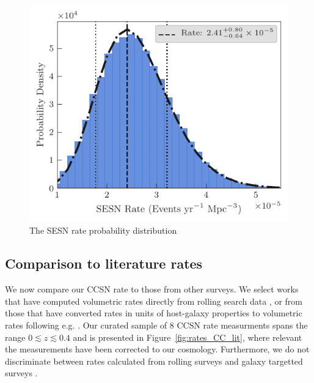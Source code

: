 \documentclass[a4paper,fleqn,usenatbib]{mnras}
\begin{document}
\begin{figure}
	\includegraphics[width=\linewidth]{./SESN_Rate.pdf}
    \caption{The SESN rate probability distribution}
    \label{fig:SESNrateProbDist}
\end{figure}

\subsection{Comparison to literature rates}

We now compare our CCSN rate to those from other surveys. We select works that have computed volumetric rates directly from rolling search data \citep[e.g.][]{2009A&A...499..653B}, or from those that have converted rates in units of host-galaxy properties to volumetric rates following e.g. \citet{2008A&A...479...49B}. Our curated sample of 8 CCSN rate measurments spans the range $0\lesssim z \lesssim 0.4$ and is presented in Figure~\ref{fig:rates_CC_lit}, where relevant the measurements have been corrected to our cosmology. Furthermore, we do not discriminate between rates calculated from rolling surveys \citep[e.g.][]{2009A&A...499..653B} and galaxy targetted surveys \citep[e.g.][]{1999A&A...351..459C}.
\end{document}
